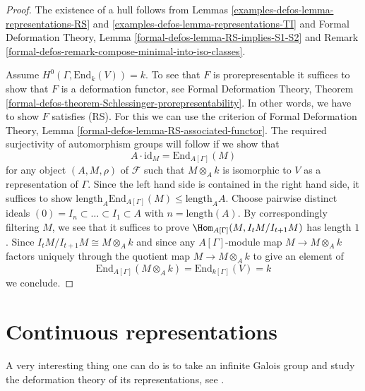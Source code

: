 \begin{proof}
The existence of a hull follows from Lemmas \ref{examples-defos-lemma-representations-RS} and
\ref{examples-defos-lemma-representations-TI} and
Formal Deformation Theory, Lemma \ref{formal-defos-lemma-RS-implies-S1-S2}
and Remark \ref{formal-defos-remark-compose-minimal-into-iso-classes}.

\medskip\noindent
Assume $H^0(\Gamma, \text{End}_k(V)) = k$. To see that $F$
is prorepresentable it suffices to show that $F$ is a
deformation functor, see Formal Deformation Theory, Theorem
\ref{formal-defos-theorem-Schlessinger-prorepresentability}.
In other words, we have to show $F$ satisfies (RS).
For this we can use the criterion of Formal Deformation Theory, Lemma
\ref{formal-defos-lemma-RS-associated-functor}.
The required surjectivity of automorphism groups will follow if we
show that
$$
A \cdot \text{id}_M =
\text{End}_{A[\Gamma]}(M)
$$
for any object $(A, M, \rho)$ of $\mathcal{F}$ such that
$M \otimes_A k$ is isomorphic to $V$ as a representation of $\Gamma$.
Since the left hand side is contained in the right hand side,
it suffices to show
$\text{length}_A \text{End}_{A[\Gamma]}(M) \leq \text{length}_A A$.
Choose pairwise distinct ideals
$(0) = I_n \subset \ldots \subset I_1 \subset A$
with $n = \text{length}(A)$. By correspondingly filtering
$M$, we see that it suffices to prove $\Hom_{A[\Gamma]}(M, I_tM/I_{t + 1}M)$
has length $1$. Since $I_tM/I_{t + 1}M \cong M \otimes_A k$
and since any $A[\Gamma]$-module map $M \to M \otimes_A k$ factors
uniquely through the quotient map $M \to M \otimes_A k$
to give an element of
$$
\text{End}_{A[\Gamma]}(M \otimes_A k) = \text{End}_{k[\Gamma]}(V) = k
$$
we conclude.
\end{proof}

\section{Continuous representations}
\label{examples-defos-section-continuous-representations}
A very interesting thing one can do is to take an infinite Galois
group and study the deformation theory of its representations, see
\cite{Mazur-deforming}.

